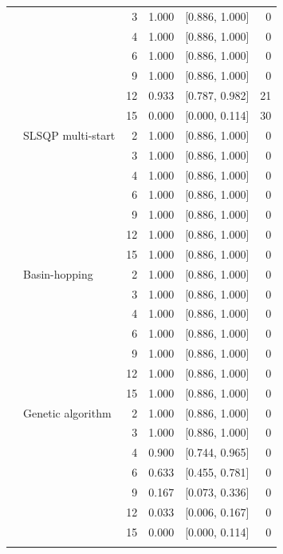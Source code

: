 \begin{tabular}{llrrrr}
 &  & 3 & 1.000 & [0.886, 1.000] & 0 \\
 &  & 4 & 1.000 & [0.886, 1.000] & 0 \\
 &  & 6 & 1.000 & [0.886, 1.000] & 0 \\
 &  & 9 & 1.000 & [0.886, 1.000] & 0 \\
 &  & 12 & 0.933 & [0.787, 0.982] & 21 \\
 &  & 15 & 0.000 & [0.000, 0.114] & 30 \\
\addlinespace
 & SLSQP multi-start & 2 & 1.000 & [0.886, 1.000] & 0 \\
 &  & 3 & 1.000 & [0.886, 1.000] & 0 \\
 &  & 4 & 1.000 & [0.886, 1.000] & 0 \\
 &  & 6 & 1.000 & [0.886, 1.000] & 0 \\
 &  & 9 & 1.000 & [0.886, 1.000] & 0 \\
 &  & 12 & 1.000 & [0.886, 1.000] & 0 \\
 &  & 15 & 1.000 & [0.886, 1.000] & 0 \\
\addlinespace
 & Basin-hopping & 2 & 1.000 & [0.886, 1.000] & 0 \\
 &  & 3 & 1.000 & [0.886, 1.000] & 0 \\
 &  & 4 & 1.000 & [0.886, 1.000] & 0 \\
 &  & 6 & 1.000 & [0.886, 1.000] & 0 \\
 &  & 9 & 1.000 & [0.886, 1.000] & 0 \\
 &  & 12 & 1.000 & [0.886, 1.000] & 0 \\
 &  & 15 & 1.000 & [0.886, 1.000] & 0 \\
\addlinespace
 & Genetic algorithm & 2 & 1.000 & [0.886, 1.000] & 0 \\
 &  & 3 & 1.000 & [0.886, 1.000] & 0 \\
 &  & 4 & 0.900 & [0.744, 0.965] & 0 \\
 &  & 6 & 0.633 & [0.455, 0.781] & 0 \\
 &  & 9 & 0.167 & [0.073, 0.336] & 0 \\
 &  & 12 & 0.033 & [0.006, 0.167] & 0 \\
 &  & 15 & 0.000 & [0.000, 0.114] & 0 \\
\addlinespace
\bottomrule
\end{tabular}